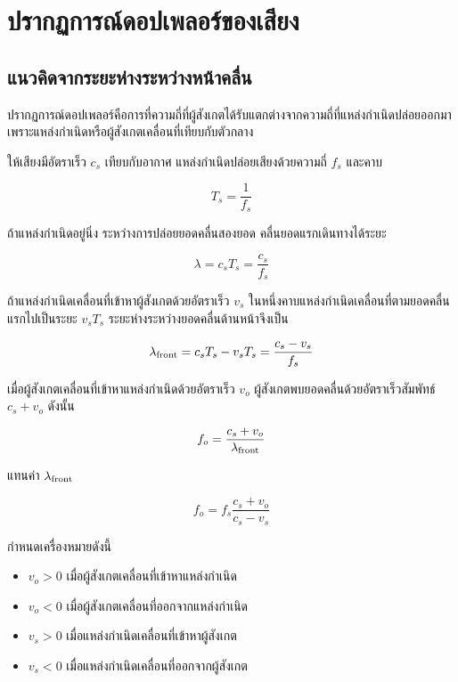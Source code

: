 \section{ปรากฏการณ์ดอปเพลอร์ของเสียง}

\subsection{แนวคิดจากระยะห่างระหว่างหน้าคลื่น}

ปรากฏการณ์ดอปเพลอร์คือการที่ความถี่ที่ผู้สังเกตได้รับแตกต่างจากความถี่ที่แหล่งกำเนิดปล่อยออกมา เพราะแหล่งกำเนิดหรือผู้สังเกตเคลื่อนที่เทียบกับตัวกลาง

ให้เสียงมีอัตราเร็ว $c_s$ เทียบกับอากาศ แหล่งกำเนิดปล่อยเสียงด้วยความถี่ $f_s$ และคาบ

\[
T_s=\frac{1}{f_s}
\]

ถ้าแหล่งกำเนิดอยู่นิ่ง ระหว่างการปล่อยยอดคลื่นสองยอด คลื่นยอดแรกเดินทางได้ระยะ

\[
\lambda=c_sT_s=\frac{c_s}{f_s}
\]

ถ้าแหล่งกำเนิดเคลื่อนที่เข้าหาผู้สังเกตด้วยอัตราเร็ว $v_s$ ในหนึ่งคาบแหล่งกำเนิดเคลื่อนที่ตามยอดคลื่นแรกไปเป็นระยะ $v_sT_s$ ระยะห่างระหว่างยอดคลื่นด้านหน้าจึงเป็น

\[
\lambda_{\rm front}
=c_sT_s-v_sT_s
=\frac{c_s-v_s}{f_s}
\]

เมื่อผู้สังเกตเคลื่อนที่เข้าหาแหล่งกำเนิดด้วยอัตราเร็ว $v_o$ ผู้สังเกตพบยอดคลื่นด้วยอัตราเร็วสัมพัทธ์ $c_s+v_o$ ดังนั้น

\[
f_o
=\frac{c_s+v_o}{\lambda_{\rm front}}
\]

แทนค่า $\lambda_{\rm front}$

\begin{tcolorbox}[title={สมการดอปเพลอร์ของเสียงในหนึ่งมิติ}]
\[
\boxed{
f_o=f_s\frac{c_s+v_o}{c_s-v_s}
}
\]

กำหนดเครื่องหมายดังนี้

\begin{itemize}
    \item $v_o>0$ เมื่อผู้สังเกตเคลื่อนที่เข้าหาแหล่งกำเนิด
    \item $v_o<0$ เมื่อผู้สังเกตเคลื่อนที่ออกจากแหล่งกำเนิด
    \item $v_s>0$ เมื่อแหล่งกำเนิดเคลื่อนที่เข้าหาผู้สังเกต
    \item $v_s<0$ เมื่อแหล่งกำเนิดเคลื่อนที่ออกจากผู้สังเกต
\end{itemize}
\end{tcolorbox}

